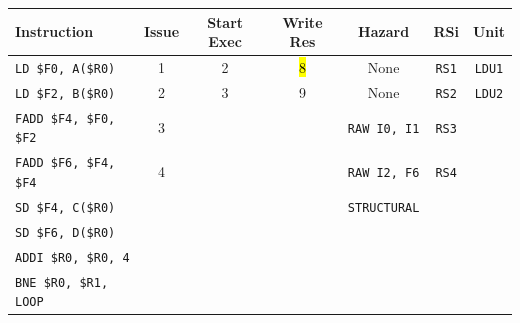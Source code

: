 \begin{enumerate}
    \begin{table}[!htp]
        \centering
        \begin{adjustbox}{width={\textwidth},totalheight={\textheight},keepaspectratio}
        \begin{tabular}{@{} l c c c c c c @{}}
            \toprule
            \textbf{Instruction} & \textbf{Issue} & \textbf{Start Exec} & \textbf{Write Res} & \textbf{Hazard} & \textbf{RSi} & \textbf{Unit} \\
            \midrule
            \texttt{LD \$F0, A(\$R0)}       & 1 & 2 & \hl{8} & None  & \texttt{RS1}   & \texttt{LDU1}  \\ [.5em]
            \texttt{LD \$F2, B(\$R0)}       & 2 & 3 & 9 & None  & \texttt{RS2}   & \texttt{LDU2}  \\ [.5em]
            \texttt{FADD \$F4, \$F0, \$F2}  & 3 &   &   & \texttt{RAW I0, I1} & \texttt{RS3} &       \\ [.5em]
            \texttt{FADD \$F6, \$F4, \$F4}  & 4 &   &   & \texttt{RAW I2, F6} & \texttt{RS4} &       \\ [.5em]
            \texttt{SD \$F4, C(\$R0)}       &   &   &   & \texttt{STRUCTURAL} &       &       \\ [.5em]
            \texttt{SD \$F6, D(\$R0)}       &   &   &   &       &       &       \\ [.5em]
            \texttt{ADDI \$R0, \$R0, 4}     &   &   &   &       &       &       \\ [.5em]
            \texttt{BNE \$R0, \$R1, LOOP}   &   &   &   &       &       &       \\
            \bottomrule
        \end{tabular}
        \end{adjustbox}
    \end{table}
    

\end{enumerate}
